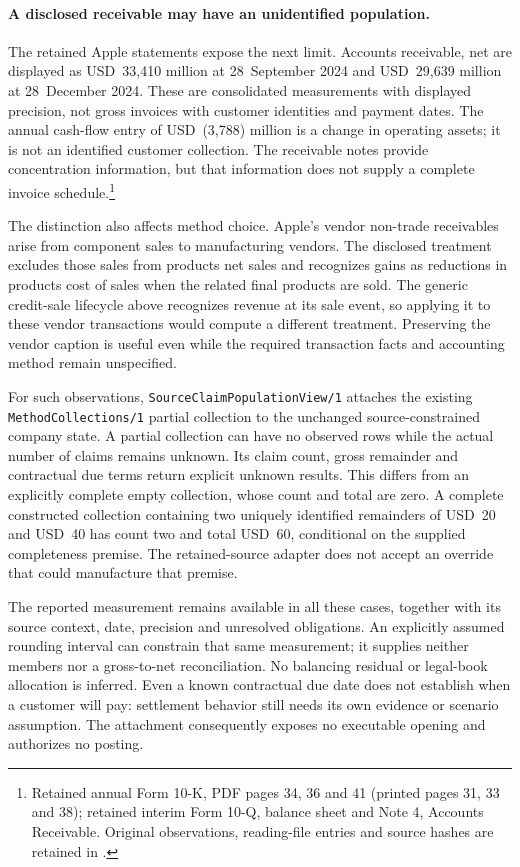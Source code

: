 \paragraph{A disclosed receivable may have an unidentified population.}
The retained Apple statements expose the next limit. Accounts receivable, net
are displayed as USD~33,410 million at 28~September 2024 and USD~29,639 million
at 28~December 2024. These are consolidated measurements with displayed
precision, not gross invoices with customer identities and payment dates. The
annual cash-flow entry of USD~(3,788) million is a change in operating assets;
it is not an identified customer collection. The receivable notes provide
concentration information, but that information does not supply a complete
invoice schedule.\footnote{Retained annual Form 10-K, PDF pages 34, 36 and 41
(printed pages 31, 33 and 38); retained interim Form 10-Q, balance sheet and
Note 4, Accounts Receivable. Original observations, reading-file entries and
source hashes are retained in
.}
\citep{apple2024,apple2025q1}

The distinction also affects method choice. Apple's vendor non-trade
receivables arise from component sales to manufacturing vendors. The disclosed
treatment excludes those sales from products net sales and recognizes gains
as reductions in products cost of sales when the related final products are
sold. The generic credit-sale lifecycle above recognizes revenue at its sale
event, so applying it to these vendor transactions would compute a different
treatment. Preserving the vendor caption is useful even while the required
transaction facts and accounting method remain unspecified.

For such observations, \texttt{SourceClaimPopulationView/1} attaches the
existing \texttt{MethodCollections/1} partial collection to the unchanged
source-constrained company state. A partial collection can have no observed
rows while the actual number of claims remains unknown. Its claim count,
gross remainder and contractual due terms return explicit unknown results.
This differs from an explicitly complete empty collection, whose count and
total are zero. A complete constructed collection containing two uniquely
identified remainders of USD~20 and USD~40 has count two and total USD~60,
conditional on the supplied completeness premise. The retained-source adapter
does not accept an override that could manufacture that premise.

The reported measurement remains available in all these cases, together with
its source context, date, precision and unresolved obligations. An explicitly
assumed rounding interval can constrain that same measurement; it supplies
neither members nor a gross-to-net reconciliation. No balancing residual or
legal-book allocation is inferred. Even a known contractual due date does
not establish when a customer will pay: settlement behavior still needs its
own evidence or scenario assumption. The attachment consequently exposes no
executable opening and authorizes no posting.

